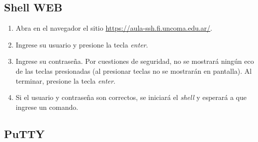 \documentclass[12pt]{article}
\begin{document}
\subsection*{Shell WEB}

\begin{enumerate}
    \item Abra en el navegador el sitio
        \url{https://aula-ssh.fi.uncoma.edu.ar/}.

    \item Ingrese su usuario y presione la tecla \emph{enter}.

    \item Ingrese su contraseña. Por cuestiones de seguridad, no se mostrará
        ningún eco de las teclas presionadas (al presionar teclas no se
        mostrarán en pantalla). Al terminar, presione la tecla 
        \emph{enter}.

    \item Si el usuario y contraseña son correctos, se iniciará el
        \emph{shell} y esperará a que ingrese un comando.

\end{enumerate}

\subsection*{PuTTY}
\end{document}

